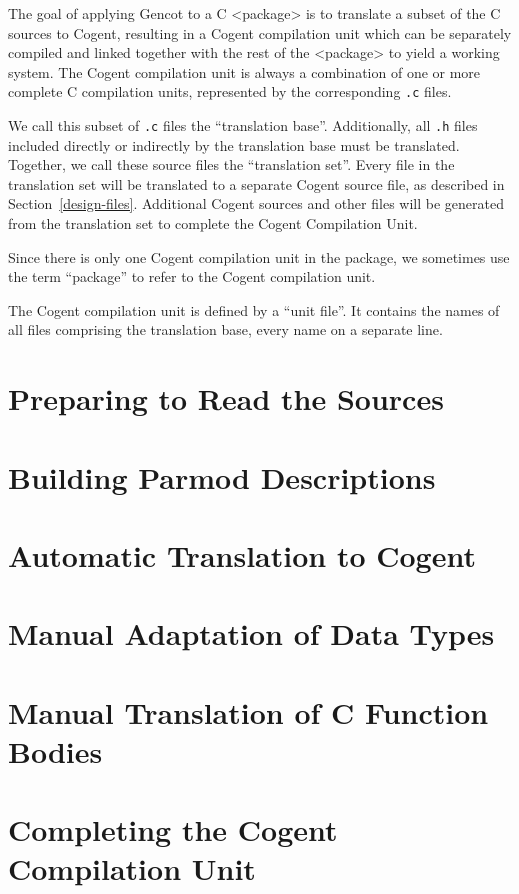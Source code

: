 \documentclass[a4paper]{report}
\newcommand{\code}[1]{\textnormal{\texttt{#1}}}
\begin{document}
The goal of applying Gencot to a C <package> is to translate a subset of the C sources to Cogent,
resulting in a Cogent compilation unit which can be separately compiled and linked together with
the rest of the <package> to yield a working system. The Cogent compilation unit is always a
combination of one or more complete C compilation units, represented by the corresponding \code{.c} 
files.

We call this subset of \code{.c} files the ``translation base''. Additionally, all \code{.h} files
included directly or indirectly by the translation base must be translated. Together, we call these
source files the ``translation set''. Every file in the translation set will be translated to a 
separate Cogent source file, as described in Section~\ref{design-files}. Additional Cogent sources
and other files will be generated from the translation set to complete the Cogent Compilation Unit.

Since there is only one Cogent compilation unit in the package, we sometimes use the term ``package''
to refer to the Cogent compilation unit. 

The Cogent compilation unit is defined by a ``unit file''. It contains the names of all files
comprising the translation base, every name on a separate line. 

\section{Preparing to Read the Sources}
\label{app-prep}
%

\section{Building Parmod Descriptions}
\label{app-parmod}


\section{Automatic Translation to Cogent}
\label{app-transauto}


\section{Manual Adaptation of Data Types}
\label{app-transtype}


\section{Manual Translation of C Function Bodies}
\label{app-transfunction}


\section{Completing the Cogent Compilation Unit}
\label{app-unit}
%
\end{document}
